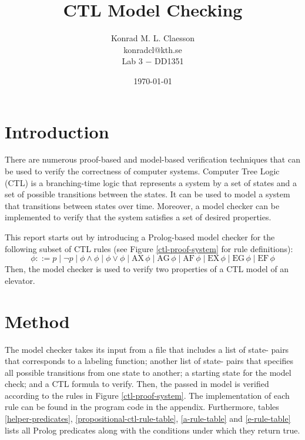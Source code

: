 \documentclass[a4paper, 11pt]{article}
\title{CTL Model Checking}
\author
{
   Konrad M. L. Claesson \\
   konradcl@kth.se \\
   Lab 3 $-$ DD1351
}
\date{\today}
\begin{document}
   \maketitle
   \thispagestyle{empty}   %
   
   \clearpage
   \newpage

   \tableofcontents
   \newpage

   \section{Introduction}

   There are numerous proof-based and model-based
   verification techniques that can be used to verify the
   correctness of computer systems. Computer Tree Logic (CTL)
   is a branching-time logic that represents a system by a set
   of states and a set of possible transitions between the 
   states. It can be used to model a system that transitions
   between states over time. Moreover, a model checker can
   be implemented to verify that the system satisfies a set
   of desired properties.
   \bigbreak

   This report starts out by introducing a Prolog-based
   model checker for the following subset of CTL rules (see
   Figure \ref{ctl-proof-system} for rule definitions):
   $$\phi ::= p 
      \mid \neg p 
      \mid \phi \wedge \phi
      \mid \phi \vee \phi
      \mid \text{AX} \, \phi
      \mid \text{AG} \, \phi
      \mid \text{AF} \, \phi
      \mid \text{EX} \, \phi
      \mid \text{EG} \, \phi
      \mid \text{EF} \, \phi
   $$
   Then, the model checker is used to verify two properties 
   of a CTL model of an elevator. 

   \section{Method}
   
   The model checker takes its input from a file that includes
   a list of state- pairs that corresponds 
   to a labeling function; another list of 
   state- pairs that specifies all possible 
   transitions from one state to another; a starting state 
   for the model check; and a CTL formula to verify. Then, 
   the passed in model is verified according to the rules in 
   Figure \ref{ctl-proof-system}. The implementation of each 
   rule can be found in the program code in the appendix. 
   Furthermore, tables 
   \ref{helper-predicates},
   \ref{propositional-ctl-rule-table},
   \ref{a-rule-table} and
   \ref{e-rule-table}
   lists all Prolog predicates 
   along with the conditions under which they return true.
\end{document}
